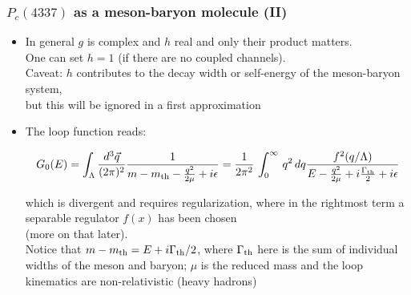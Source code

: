 \documentclass[utf8,10pt]{beamer}
\begin{document}
\begin{frame}
\frametitle{$P_{c}(4337)$ as a meson-baryon molecule (II)}

\vspace{-0.35cm}

\begin{itemize}
\item In general $g$ is complex and $h$ real and only their product matters. \\
  One can set $h=1$ (if there are no coupled channels). \\
  \vspace{0.15cm}
         {\scriptsize {\color{magenta} Caveat:} $h$ contributes to the decay
           width or self-energy of the meson-baryon system, \\ but this will be
           ignored in a first approximation}

       \item The loop function reads:

         {\small
         $$
         G_0(E) = \int_{\Lambda} \frac{d^3 \vec{q}}{(2\pi)^2} \frac{1}{m - m_{\rm th} - \frac{q^2}{2\mu} + i \epsilon}
         = \frac{1}{2\pi^2}\,\int_0^{\infty}\,q^2\,dq
         \frac{f^2(q/\Lambda)}{E - \frac{q^2}{2\mu} + i \frac{\Gamma_{\rm th}}{2} + i \epsilon }
         $$}

         which is divergent and requires regularization, where in the
         rightmost term a separable regulator $f(x)$ has been chosen \\
         (more on that later). \\

         \vspace{0.15cm}
         Notice that $m - m_{\rm th} = E + i \Gamma_{\rm th}/2$,
         where $\Gamma_{\rm th}$ here is
         the sum of individual widths of the meson and baryon; $\mu$ is
         the reduced mass and the loop kinematics are non-relativistic
         (heavy hadrons)
\end{itemize}

\end{frame}
\end{document}
